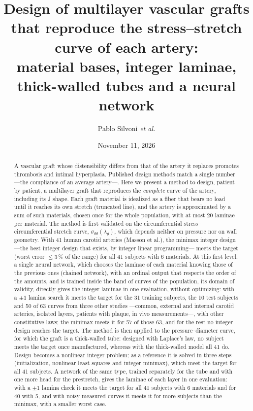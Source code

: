 
\title{\textbf{Design of multilayer vascular grafts that reproduce the stress--stretch curve of each artery:\\ material bases, integer laminae, thick-walled tubes and a neural network}}
\author{Pablo Silvoni \textit{et al.}}
\date{November 11, 2026}

\maketitle
\begin{abstract}
\noindent A vascular graft whose distensibility differs from that of the artery it replaces promotes thrombosis and intimal hyperplasia. Published design methods match a single number ---the compliance of an average artery---. Here we present a method to design, patient by patient, a multilayer graft that reproduces the \emph{complete} curve of the artery, including its J shape. Each graft material is idealized as a fiber that bears no load until it reaches its own stretch (truncated line), and the artery is approximated by a sum of such materials, chosen once for the whole population, with at most 20 laminae per material. The method is first validated on the circumferential stress--circumferential stretch curve, $\sigma_{\theta\theta}(\lambda_\theta)$, which depends neither on pressure nor on wall geometry. With 41 human carotid arteries (Masson et al.), the minimax integer design ---the best integer design that exists, by integer linear programming--- meets the target (worst error $\le3$\,\% of the range) for all 41 subjects with 6 materials. At this first level, a single neural network, which chooses the laminae of each material knowing those of the previous ones (chained network), with an ordinal output that respects the order of the amounts, and is trained inside the band of curves of the population, its domain of validity, directly gives the integer laminae in one evaluation, without optimizing: with a $\pm1$ lamina search it meets the target for the 31 training subjects, the 10 test subjects and 50 of 63 curves from three other studies ---common, external and internal carotid arteries, isolated layers, patients with plaque, in vivo measurements---, with other constitutive laws; the minimax meets it for 57 of those 63, and for the rest no integer design reaches the target. The method is then applied to the pressure--diameter curve, for which the graft is a thick-walled tube: designed with Laplace's law, no subject meets the target once manufactured, whereas with the thick-walled model all 41 do. Design becomes a nonlinear integer problem; as a reference it is solved in three steps (initialization, nonlinear least squares and integer minimax), which meet the target for all 41 subjects. A network of the same type, trained separately for the tube and with one more head for the prestretch, gives the laminae of each layer in one evaluation: with a $\pm1$ lamina check it meets the target for all 41 subjects with 6 materials and for 40 with 5, and with noisy measured curves it meets it for more subjects than the minimax, with a smaller worst case.
\end{abstract}
\tableofcontents

